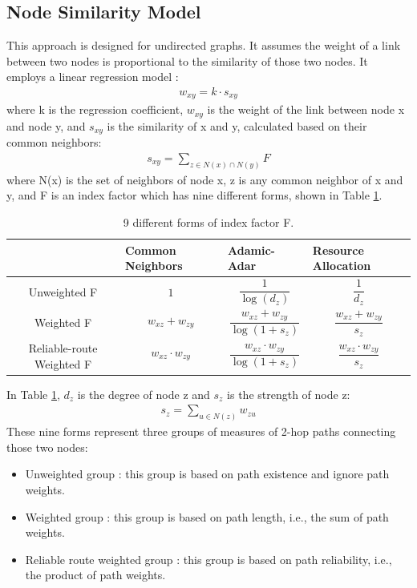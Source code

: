 \documentclass[12pt]{WSUThesis}
\theoremstyle{definition}
\begin{document}
\subsection{Node Similarity Model}
This approach is designed for undirected graphs.
It assumes the weight of a link between two nodes 
is proportional to the similarity of those two nodes.
It employs a linear regression model \cite{zhao2015prediction}:
\begin{align*}
w_{xy} = k \cdot s_{xy}
\end{align*}
where k is the regression coefficient,
$ w_{xy} $ is the weight of the link between node x and node y,
and $ s_{xy} $ is the similarity of x and y, calculated based on their common neighbors:
\begin{align*}
s_{xy} = \sum_{z \in N(x) \cap N(y)} F
\end{align*}
where N(x) is the set of neighbors of node x, z is any common neighbor of x and y,
and F is an index factor which has nine different forms, shown in Table \ref{tab:indexes}.
\begin{table}[!ht]\centering
	\caption{9 different forms of index factor F.}
	\begin{tabularx}{\textwidth}{>{\columncolor{blue!30}}cXXX}  \hline \rowcolor{blue!30}
		& Common Neighbors & Adamic-Adar & Resource Allocation \\ \hline
		Unweighted F &
		\[1\] &
		\[\frac{1}{\log(d_z)}\] &
		\[\frac{1}{d_z}\] \\ \hline
		Weighted F &
		\[w_{xz} + w_{zy}\] &
		\[\frac{w_{xz} + w_{zy}}{\log(1 + s_z)}\] &
		\[\frac{w_{xz} + w_{zy}}{s_z}\] \\ \hline
		Reliable-route Weighted F &
		\[ w_{xz} \cdot w_{zy}\] &
		\[\frac{w_{xz} \cdot w_{zy}}{\log(1 + s_z)}\] &
		\[\frac{w_{xz} \cdot w_{zy}}{s_z}\] \\ \hline
	\end{tabularx}
	\label{tab:indexes}
\end{table}
In Table \ref{tab:indexes}, $ d_z $ is the degree of node z and $ s_z $ is the strength of node z:
\begin{align*}
s_z = \sum_{u \in N(z)} w_{zu}
\end{align*}
These nine forms represent three groups of measures of 2-hop paths connecting those two nodes:
\begin{itemize}
	\item Unweighted group \cite{adamic2003friends}:
	this group is based on path existence and ignore path weights.
	\item Weighted group \cite{murata2007link}:
	this group is based on path length, i.e., the sum of path weights.
	\item Reliable route weighted group \cite{taha1982operations}:
	this group is based on path reliability, i.e., the product of path weights.
\end{itemize}
\end{document}
